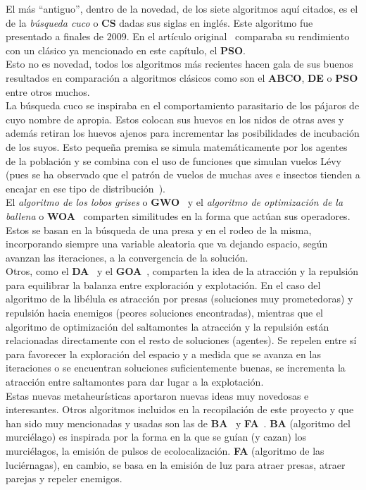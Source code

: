 El más ``antiguo'', dentro de la novedad, de los siete algoritmos aquí citados, es el de la \textit{búsqueda cuco} o \textbf{CS} dadas sus siglas en inglés. Este algoritmo fue presentado a finales de $2009$. En el artículo original~\cite{yang_cuckoo_2010} comparaba su rendimiento con un clásico ya mencionado en este capítulo, el \textbf{PSO}.\\[6pt]
Esto no es novedad, todos los algoritmos más recientes hacen gala de sus buenos resultados en comparación a algoritmos clásicos como son el \textbf{ABCO}, \textbf{DE} o \textbf{PSO} entre otros muchos.\\[6pt]
La búsqueda cuco se inspiraba en el comportamiento parasitario de los pájaros de cuyo nombre de apropia. Estos colocan sus huevos en los nidos de otras aves y además retiran los huevos ajenos para incrementar las posibilidades de incubación de los suyos. Esto pequeña premisa se simula matemáticamente por los agentes de la población y se combina con el uso de funciones que simulan vuelos Lévy (pues se ha observado que el patrón de vuelos de muchas aves e insectos tienden a encajar en ese tipo de distribución~\cite{GUY2008585}).\\[6pt]
El \textit{algoritmo de los lobos grises} o \textbf{GWO}~\cite{mirjalili_grey_2014} y el \textit{algoritmo de optimización de la ballena} o \textbf{WOA}~\cite{mirjalili_whale_2016} comparten similitudes en la forma que actúan sus operadores. Estos se basan en la búsqueda de una presa y en el rodeo de la misma, incorporando siempre una variable aleatoria que va dejando espacio, según avanzan las iteraciones, a la convergencia de la solución.\\[6pt]
Otros, como el \textbf{DA}~\cite{mirjalili_dragonfly_2016} y el \textbf{GOA}~\cite{saremi_grasshopper_2017}, comparten la idea de la atracción y la repulsión para equilibrar la balanza entre exploración y explotación. En el caso del algoritmo de la libélula es atracción por presas (soluciones muy prometedoras) y repulsión hacia enemigos (peores soluciones encontradas), mientras que el algoritmo de optimización del saltamontes la atracción y la repulsión están relacionadas directamente con el resto de soluciones (agentes). Se repelen entre sí para favorecer la exploración del espacio y a medida que se avanza en las iteraciones o se encuentran soluciones suficientemente buenas, se incrementa la atracción entre saltamontes para dar lugar a la explotación.\\[6pt]
Estas nuevas metaheurísticas aportaron nuevas ideas muy novedosas e interesantes.
Otros algoritmos incluidos en la recopilación de este proyecto y que han sido muy mencionadas y usadas son las de \textbf{BA}~\cite{yang_new_2010} y \textbf{FA}~\cite{yang_chapter_2014}. \textbf{BA} (algoritmo del murciélago) es inspirada por la forma en la que se guían (y cazan) los murciélagos, la emisión de pulsos de ecolocalización. \textbf{FA} (algoritmo de las luciérnagas), en cambio, se basa en la emisión de luz para atraer presas, atraer parejas y repeler enemigos.\\[6pt]

